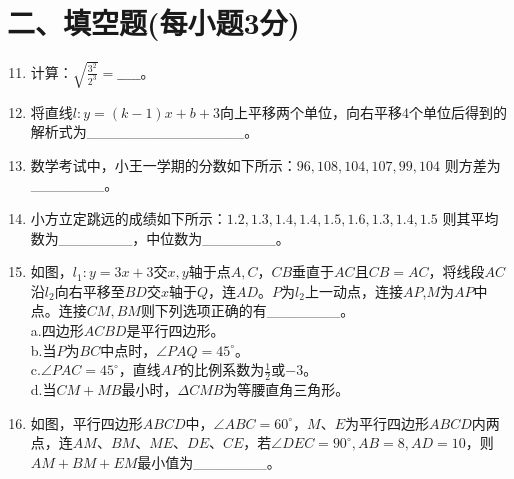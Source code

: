 \documentclass[10pt]{article}
\begin{document}
\section*{\normalsize 二、填空题(每小题3分)}
\begin{enumerate}\setcounter{enumi}{10}
    \item 计算：$\sqrt{\frac{3^2}{2^3}}=\_\_\_\_\_$。
    \item 将直线$l:y=(k-1)x+b+3$向上平移两个单位，向右平移$4$个单位后得到的解析式为\_\_\_\_\_\_\_\_\_\_\_\_\_\_\_。
    \item 数学考试中，小王一学期的分数如下所示：$96,108,104,107,99,104$ 则方差为\_\_\_\_\_\_\_。
    \item 小方立定跳远的成绩如下所示：$1.2,1.3,1.4,1.4,1.5,1.6,1.3,1.4,1.5$ 则其平均数为\_\_\_\_\_\_\_，中位数为\_\_\_\_\_\_\_。
    \item 如图，$l_1:y=3x+3$交$x,y$轴于点$A,C$，$CB$垂直于$AC$且$CB=AC$，将线段$AC$沿$l_2$向右平移至$BD$交$x$轴于$Q$，连$AD$。$P$为$l_2$上一动点，连接$AP$,$M$为$AP$中点。连接$CM,BM$则下列选项正确的有\_\_\_\_\_\_\_。\\
    a.四边形$ACBD$是平行四边形。\\
    b.当$P$为$BC$中点时，$\angle PAQ=45^\circ$。\\
    c.$\angle PAC=45^\circ$，直线$AP$的比例系数为$\frac{1}{2}$或$-3$。\\
    d.当$CM+MB$最小时，$\Delta CMB$为等腰直角三角形。
    \item 如图，平行四边形$ABCD$中，$\angle ABC=60^\circ$，$M$、$E$为平行四边形$ABCD$内两点，连$AM$、$BM$、$ME$、$DE$、$CE$，若$\angle DEC=90^\circ,AB=8,AD=10$，则$AM+BM+EM$最小值为\_\_\_\_\_\_\_。\\
\end{enumerate}
\end{document}
